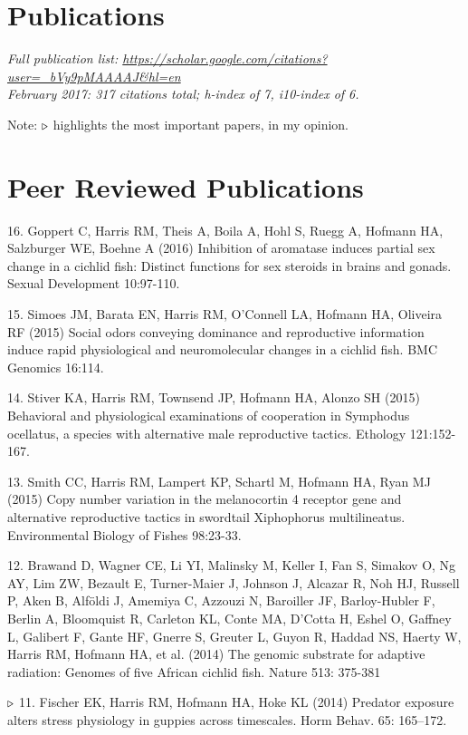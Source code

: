 \documentclass[margin,line]{resume}
\begin{document}
\begin{resume}
    \section{\mysidestyle Publications}

{\em Full publication list: \url{https://scholar.google.com/citations?user=_bVy9pMAAAAJ&hl=en}
\\
  February 2017: 317 citations total; h-index of 7, i10-index of 6.}
  
Note: {\color{red} ${\bf \triangleright}$} highlights the most important
papers, in my opinion.

    \section{\mysidestyle Peer Reviewed Publications}

16. Goppert C, Harris RM, Theis A, Boila A, Hohl S, Ruegg A, Hofmann HA, Salzburger WE, Boehne A (2016)  Inhibition of aromatase induces partial sex change in a cichlid fish: Distinct functions for sex steroids in brains and gonads. Sexual Development 10:97-110.

15. Simoes JM, Barata EN, Harris RM, O'Connell LA, Hofmann HA, Oliveira RF (2015) Social odors conveying dominance and reproductive information induce rapid physiological and neuromolecular changes in a cichlid fish. BMC Genomics 16:114. 

14. Stiver KA, Harris RM, Townsend JP, Hofmann HA, Alonzo SH (2015) Behavioral and physiological examinations of cooperation in Symphodus ocellatus, a species with alternative male reproductive tactics. Ethology 121:152-167.

13. Smith CC, Harris RM, Lampert KP, Schartl M, Hofmann HA, Ryan MJ (2015) Copy number variation in the melanocortin 4 receptor gene and alternative reproductive tactics in swordtail Xiphophorus multilineatus. Environmental Biology of Fishes 98:23-33.

12. Brawand D, Wagner CE, Li YI, Malinsky M, Keller I, Fan S, Simakov O, Ng AY, Lim ZW, Bezault E, Turner-Maier J, Johnson J, Alcazar R, Noh HJ, Russell P, Aken B, Alföldi J, Amemiya C, Azzouzi N, Baroiller JF, Barloy-Hubler F, Berlin A, Bloomquist R, Carleton KL, Conte MA, D'Cotta H, Eshel O, Gaffney L, Galibert F, Gante HF, Gnerre S, Greuter L, Guyon R, Haddad NS, Haerty W, Harris RM, Hofmann HA, et al. (2014) The genomic substrate for adaptive radiation: Genomes of five African cichlid fish. Nature 513: 375-381

{\color{red} ${\bf \triangleright}$}
11. Fischer EK, Harris RM, Hofmann HA, Hoke KL (2014) Predator exposure alters stress physiology in guppies across timescales. Horm Behav. 65: 165–172. 


\end{resume}
\end{document}

